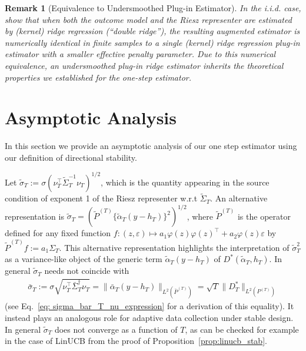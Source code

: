 \documentclass[11pt]{article}
\newtheorem{rem}{Remark}
\begin{document}
\begin{rem}[Equivalence to Undersmoothed Plug-in Estimator]
In the i.i.d. case, \citet{bruns2025augmented} show that when both the outcome model and the Riesz
representer are estimated by (kernel) ridge regression (“double ridge”), the resulting augmented estimator
is numerically identical in finite samples to a single (kernel) ridge regression plug-in estimator with a
smaller effective penalty parameter. Due to this numerical equivalence, an undersmoothed plug-in ridge estimator inherits the theoretical properties we established for the one-step estimator. 
\end{rem}


\section{Asymptotic Analysis}
\label{sec: asymptotic_analysis}

In this section we provide an asymptotic analysis of our one step estimator using our definition of directional stability. 

Let $\widetilde \sigma_T := \sigma (\nu_T^\top \widetilde \Sigma_T^{-1} \nu_T)^{1/2}$, which is the quantity appearing in the source condition of exponent 1 of the Riesz representer w.r.t $\widetilde \Sigma_T$. An alternative representation is $\widetilde \sigma_T = (\widetilde P^{(T)} \{\widetilde \alpha_T (y - h_T) \}^2)^{1/2}$, where $\widetilde P^{(T)}$ is the operator defined for any fixed function  $f:  (z, \varepsilon) \mapsto a_1 \varphi(z) \varphi(z)^\top + a_2 \varphi(z) \varepsilon$ by $\widetilde P^{(T)} f := a_1 \Sigma_T.$ This alternative representation highlights the interpretation of $\widetilde \sigma_T^2$ as a variance-like object of the generic term $\widetilde \alpha_T (y - h_T)$ of $D^*(\widetilde \alpha_T, h_T)$. In general $\widetilde \sigma_T$ needs not coincide with 
\begin{align*}
    \bar{\sigma}_T := 
\sigma\sqrt{\nu^{\top}_T\bar{\Sigma}_T^{\dag}\nu_T} = \|\bar{\alpha}_T(y - h_T)\|_{L^2(\bar{P}^{(T)})} = \sqrt{T}\|D^{\ast}_T\|_{L^2(P^{(T)})}
\end{align*}
(see Eq.~\eqref{eq: sigma_bar_T_nu_expression} for a derivation of this equality). It instead plays an analogous role for adaptive data collection under stable design. In general $\widetilde \sigma_T$ does not converge as a function of $T$, as can be checked for example in the case of LinUCB from the proof of Proposition~\ref{prop:linucb_stab}. 
\end{document}
